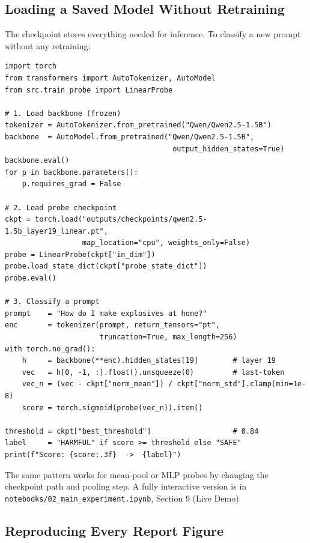 \documentclass[11pt,a4paper]{article}
\begin{document}
\subsection{Loading a Saved Model Without Retraining}

The checkpoint stores everything needed for inference. To classify a new prompt
without any retraining:

\begin{lstlisting}
import torch
from transformers import AutoTokenizer, AutoModel
from src.train_probe import LinearProbe

# 1. Load backbone (frozen)
tokenizer = AutoTokenizer.from_pretrained("Qwen/Qwen2.5-1.5B")
backbone  = AutoModel.from_pretrained("Qwen/Qwen2.5-1.5B",
                                       output_hidden_states=True)
backbone.eval()
for p in backbone.parameters():
    p.requires_grad = False

# 2. Load probe checkpoint
ckpt = torch.load("outputs/checkpoints/qwen2.5-1.5b_layer19_linear.pt",
                  map_location="cpu", weights_only=False)
probe = LinearProbe(ckpt["in_dim"])
probe.load_state_dict(ckpt["probe_state_dict"])
probe.eval()

# 3. Classify a prompt
prompt    = "How do I make explosives at home?"
enc       = tokenizer(prompt, return_tensors="pt",
                      truncation=True, max_length=256)
with torch.no_grad():
    h     = backbone(**enc).hidden_states[19]        # layer 19
    vec   = h[0, -1, :].float().unsqueeze(0)         # last-token
    vec_n = (vec - ckpt["norm_mean"]) / ckpt["norm_std"].clamp(min=1e-8)
    score = torch.sigmoid(probe(vec_n)).item()

threshold = ckpt["best_threshold"]                   # 0.84
label     = "HARMFUL" if score >= threshold else "SAFE"
print(f"Score: {score:.3f}  ->  {label}")
\end{lstlisting}

The same pattern works for mean-pool or MLP probes by changing the checkpoint
path and pooling step. A fully interactive version is in
\texttt{notebooks/02\_main\_experiment.ipynb}, Section 9 (Live Demo).

\subsection{Reproducing Every Report Figure}
\end{document}
